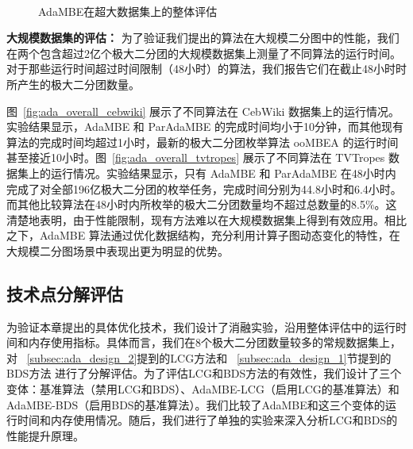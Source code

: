\begin{figure} [H]
  \centering
	\vspace{0.05in}
	\\

  \caption{AdaMBE在超大数据集上的整体评估}
  \label{fig:ada_overall_large}
\end{figure}

\textbf{大规模数据集的评估：} 为了验证我们提出的算法在大规模二分图中的性能，我们在两个包含超过2亿个极大二分团的大规模数据集上测量了不同算法的运行时间。对于那些运行时间超过时间限制（48小时）的算法，我们报告它们在截止48小时时所产生的极大二分团数量。



图~\ref{fig:ada_overall_cebwiki} 展示了不同算法在 CebWiki 数据集上的运行情况。实验结果显示，AdaMBE 和 ParAdaMBE 的完成时间均小于10分钟，而其他现有算法的完成时间均超过1小时，最新的极大二分团枚举算法 ooMBEA 的运行时间甚至接近10小时。图~\ref{fig:ada_overall_tvtropes} 展示了不同算法在 TVTropes 数据集上的运行情况。实验结果显示，只有 AdaMBE 和 ParAdaMBE 在48小时内完成了对全部196亿极大二分团的枚举任务，完成时间分别为44.8小时和6.4小时。而其他比较算法在48小时内所枚举的极大二分团数量均不超过总数量的8.5\%。这清楚地表明，由于性能限制，现有方法难以在大规模数据集上得到有效应用。相比之下，AdaMBE 算法通过优化数据结构，充分利用计算子图动态变化的特性，在大规模二分图场景中表现出更为明显的优势。

\subsection{技术点分解评估}
\label{subsec:ada_breakdown}

为验证本章提出的具体优化技术，我们设计了消融实验，沿用整体评估中的运行时间和内存使用指标。具体而言，我们在8个极大二分团数量较多的常规数据集上，对
~\ref{subsec:ada_design_2}提到的LCG方法和
~\ref{subsec:ada_design_1}节提到的BDS方法
进行了分解评估。为了评估LCG和BDS方法的有效性，我们设计了三个变体：基准算法（禁用LCG和BDS）、AdaMBE-LCG（启用LCG的基准算法）和AdaMBE-BDS（启用BDS的基准算法）。我们比较了AdaMBE和这三个变体的运行时间和内存使用情况。随后，我们进行了单独的实验来深入分析LCG和BDS的性能提升原理。

